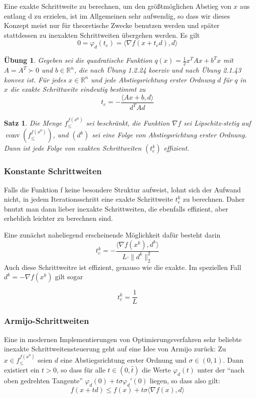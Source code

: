 \documentclass[11pt]{scrreprt}
\newcounter{thm}
\theoremstyle{thmstyle}
\numberwithin{thm}{section}
\newtheorem{satz}[thm]{Satz}
\newtheorem{uebung}[thm]{Übung}
\begin{document}
Eine exakte Schrittweite zu berechnen, um den größtmöglichen Abstieg von $x$ aus entlang d zu erzielen, ist im Allgemeinen sehr aufwendig, so dass wir dieses Konzept meist nur für theoretische Zwecke benutzen werden und später stattdessen zu inexakten Schrittweiten übergehen werden.  Es gilt
	$$ 0 = \varphi_d(t_e) = \langle \nabla f(x + t_ed), d \rangle $$

\begin{uebung}
	Gegeben sei die quadratische Funktion $q(x) = \frac{1}{2} x^T A x + b^T x$ mit $A = A^T \succ 0$ und $b \in \mathbb{R}^n$, die nach Übung 1.2.24 koerziv und nach Übung 2.1.43 konvex ist. Für 
	jedes $x \in \mathbb{R}^n$ und jede Abstiegsrichtung erster Ordnung $d$ 
	für $q$ in $x$ die exakte Schrittweite eindeutig bestimmt zu
	$$ t_e = - \frac{\langle Ax + b, d \rangle}{d^T A d} $$
\end{uebung}

\begin{satz}
	Die Menge $f_{\leq}^{f(x^0)}$ sei beschränkt, die Funktion $\nabla f$ sei Lipschitz-stetig auf $\operatorname{conv}(f_{\leq}^{f(x^0)})$, und $(d^k)$ sei eine Folge von Abstiegsrichtung erster Ordnung. Dann ist jede Folge von exakten Schrittweiten $(t_e^k)$ effizient.
\end{satz}

\subsubsection*{Konstante Schrittweiten}

Falls die Funktion f keine besondere Struktur aufweist, lohnt sich der Aufwand nicht, in jedem Iterationsschritt eine exakte Schrittweite $t_e^k$ zu berechnen. Daher bnutzt man dann lieber inexakte Schrittweiten, die ebenfalls effizient, aber erheblich leichter zu berechnen sind. ~\bigskip

Eine zunächst naheliegend erscheinende Möglichkeit dafür besteht darin 
 $$ t_c^k = - \frac{\langle \nabla f(x^k), d^k \rangle}{L \cdot \|d^k \|_2^2} $$
Auch diese Schrittweitre ist effizient, genauso wie die exakte. Im speziellen Fall $d^k = -\nabla f (x^k)$ gilt sogar

	$$ t_c^k = \frac{1}{L} $$
	

\subsubsection*{Armijo-Schrittweiten}
	
Eine in modernen Implementierungen von Optimierungsverfahren sehr beliebte inexakte Schrittweitensteuerung geht auf eine Idee von Armijo zurück: Zu $x \in f_{\leq}^{f(x^0)}$ seien $d$ eine Abstiegsrichtung erster Ordnung und $\sigma \in (0,1)$. Dann existiert ein $t > 0$, so dass für alle $t \in (0, \hat{t})$ die Werte $\varphi_d(t)$ unter der \enquote{nach oben gedrehten Tangente} $\varphi_d(0) + t \sigma \varphi_d'(0)$ liegen, so dass also gilt:	
	$$ f(x + td) \leq f(x) + t \sigma \langle \nabla f(x), d \rangle $$
	
\end{document}
